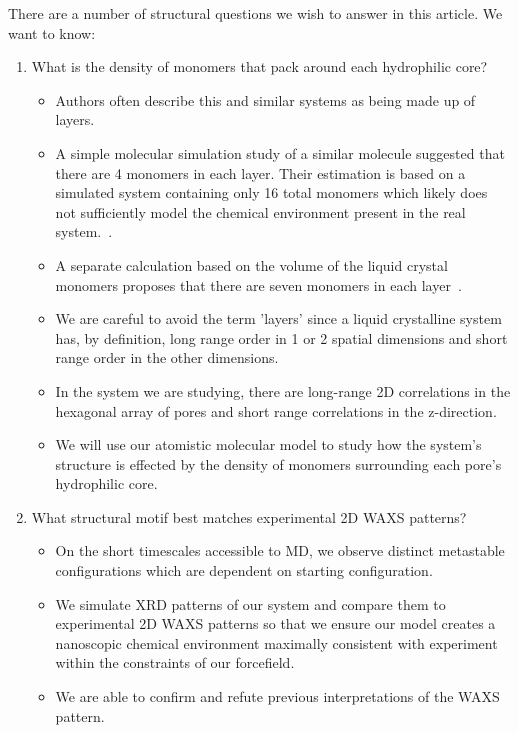 \documentclass{article}
\begin{document}
  There are a number of structural questions we wish to answer in this article. We
  want to know:
  \begin{enumerate}
    \item What is the density of monomers that pack around each hydrophilic core? 
    \label{point:monomernum}
 	\begin{itemize}
 		\item Authors often describe this and similar systems as being made up of layers.
 		\item A simple molecular simulation study of a similar molecule suggested
	    that there are 4 monomers in each layer. Their estimation is based on a
	    simulated system containing only 16 total monomers which likely does not sufficiently
	    model the chemical environment present in the real system.~\cite{zhu_methacrylated_2006}. 
	    \item A separate calculation based on the volume of the liquid crystal monomers proposes
	    that there are seven monomers in each layer~\cite{resel_structural_2000}. 
 		\item We are careful to avoid the term 'layers' since a liquid crystalline system has,
 		by definition, long range order in 1 or 2 spatial dimensions and short range order in 	
 		the other dimensions.~\cite{chaikin_principles_1995}  %
 		\item In the system we are studying, there are long-range 2D correlations in the 
 		hexagonal array of pores and short range correlations in the z-direction.
		\item We will use our atomistic molecular model to study how the system's structure is
		effected by the density of monomers surrounding each pore's hydrophilic core. 
	\end{itemize}
	\item What structural motif best matches experimental 2D WAXS patterns?\label{point:xrdmatch}
	\begin{itemize}
		\item On the short timescales accessible to MD, we observe distinct metastable 
		configurations which are dependent on starting configuration.
		\item We simulate XRD patterns of our system and compare them to experimental 2D WAXS 
		patterns so that we ensure our model creates a nanoscopic chemical environment maximally
		consistent with experiment within the constraints of our forcefield.
		\item We are able to confirm and refute previous interpretations of the WAXS pattern.  

\end{itemize}
\end{enumerate}
\end{document}
